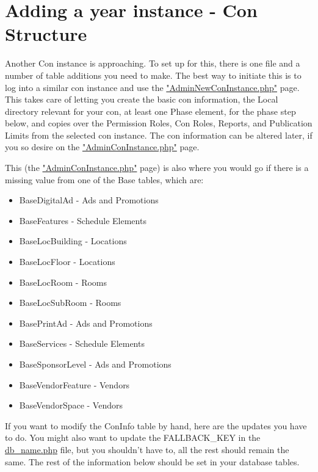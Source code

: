 \documentclass[captions=tablesignature]{scrartcl}
\begin{document}
\section{Adding a year instance - Con Structure}
\label{sec-11}

Another Con instance is approaching.  To set up for this, there is
one file and a number of table additions you need to make.  The best
way to initiate this is to log into a similar con instance and use
the \href{../webpages/AdminNewConInstance.php}{"AdminNewConInstance.php"} page.  This takes care of letting you
create the basic con information, the Local directory relevant for
your con, at least one Phase element, for the phase step below, and
copies over the Permission Roles, Con Roles, Reports, and
Publication Limits from the selected con instance.  The con
information can be altered later, if you so desire on the
\href{../webpages/AdminConInstance.php}{"AdminConInstance.php"} page.

This (the \href{../webpages/AdminConInstance.php}{"AdminConInstance.php"} page) is also where you would go if
there is a missing value from one of the Base tables, which are:
\begin{itemize}
\item BaseDigitalAd - Ads and Promotions
\item BaseFeatures - Schedule Elements
\item BaseLocBuilding - Locations
\item BaseLocFloor - Locations
\item BaseLocRoom - Rooms
\item BaseLocSubRoom - Rooms
\item BasePrintAd - Ads and Promotions
\item BaseServices - Schedule Elements
\item BaseSponsorLevel - Ads and Promotions
\item BaseVendorFeature - Vendors
\item BaseVendorSpace - Vendors
\end{itemize}

If you want to modify the ConInfo table by hand, here are the
updates you have to do.  You might also want to update the
FALLBACK\_KEY in the \href{../Local/db_name.php}{db\_name.php} file, but you shouldn't have
to, all the rest should remain the same.  The rest of the
information below should be set in your database tables.
\end{document}
